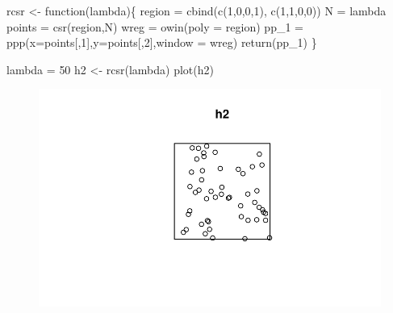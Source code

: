 \documentclass[
  letterpaper,
  DIV=11,
  numbers=noendperiod]{scrartcl}
\newenvironment{Shaded}{\begin{snugshade}}{\end{snugshade}}
\newcommand{\AttributeTok}[1]{\textcolor[rgb]{0.40,0.45,0.13}{#1}}
\newcommand{\ControlFlowTok}[1]{\textcolor[rgb]{0.00,0.23,0.31}{#1}}
\newcommand{\DecValTok}[1]{\textcolor[rgb]{0.68,0.00,0.00}{#1}}
\newcommand{\FunctionTok}[1]{\textcolor[rgb]{0.28,0.35,0.67}{#1}}
\newcommand{\NormalTok}[1]{\textcolor[rgb]{0.00,0.23,0.31}{#1}}
\newcommand{\OtherTok}[1]{\textcolor[rgb]{0.00,0.23,0.31}{#1}}
\begin{document}
\begin{Shaded}
\begin{Highlighting}[]
\NormalTok{rcsr }\OtherTok{\textless{}{-}} \ControlFlowTok{function}\NormalTok{(lambda)\{}
\NormalTok{  region }\OtherTok{=} \FunctionTok{cbind}\NormalTok{(}\FunctionTok{c}\NormalTok{(}\DecValTok{1}\NormalTok{,}\DecValTok{0}\NormalTok{,}\DecValTok{0}\NormalTok{,}\DecValTok{1}\NormalTok{), }\FunctionTok{c}\NormalTok{(}\DecValTok{1}\NormalTok{,}\DecValTok{1}\NormalTok{,}\DecValTok{0}\NormalTok{,}\DecValTok{0}\NormalTok{))}
\NormalTok{  N }\OtherTok{=}\NormalTok{ lambda}
\NormalTok{  points }\OtherTok{=} \FunctionTok{csr}\NormalTok{(region,N)}
\NormalTok{  wreg }\OtherTok{=} \FunctionTok{owin}\NormalTok{(}\AttributeTok{poly =}\NormalTok{ region)}
\NormalTok{  pp\_1 }\OtherTok{=} \FunctionTok{ppp}\NormalTok{(}\AttributeTok{x=}\NormalTok{points[,}\DecValTok{1}\NormalTok{],}\AttributeTok{y=}\NormalTok{points[,}\DecValTok{2}\NormalTok{],}\AttributeTok{window =}\NormalTok{ wreg)}
  \FunctionTok{return}\NormalTok{(pp\_1)}
\NormalTok{\}}
\end{Highlighting}
\end{Shaded}

\begin{Shaded}
\begin{Highlighting}[]
\NormalTok{lambda }\OtherTok{=} \DecValTok{50}
\NormalTok{h2 }\OtherTok{\textless{}{-}} \FunctionTok{rcsr}\NormalTok{(lambda)}
\FunctionTok{plot}\NormalTok{(h2)}
\end{Highlighting}
\end{Shaded}

\begin{figure}[H]

{\centering \includegraphics{robby_homework_1---Copy_files/figure-pdf/unnamed-chunk-8-1.pdf}

}

\end{figure}
\end{document}
